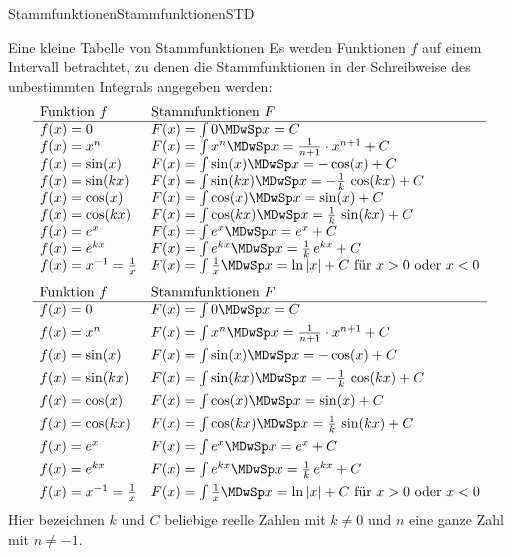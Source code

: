 \begin{MXContent}{Stammfunktionen}{Stammfunktionen}{STD}
\begin{MXInfo}{Eine kleine Tabelle von Stammfunktionen}%
%
Es werden Funktionen $f$ auf einem Intervall betrachtet, zu denen die 
Stammfunktionen in der Schreibweise des unbestimmten Integrals angegeben werden:
\ifttm
\[
\begin{array}{ll}
\text{Funktion } f & \text{Stammfunktionen } F \\
\hline
f(x) = 0                    & F(x) = \int 0 \MDwSp x = C \\
f(x) = x^n                  & F(x) = \int x^n \MDwSp x = \frac{1}{n+1} \cdot x^{n+1} + C \\
f(x) = \sin(x)              & F(x) = \int \sin(x) \MDwSp x = -\cos(x) + C \\
f(x) = \sin(k x)            & F(x) = \int \sin(k x) \MDwSp x = -\frac{1}{k}\,\cos(k x) + C \\
f(x) = \cos(x)              & F(x) = \int \cos(x) \MDwSp x = \sin(x) + C \\
f(x) = \cos(k x)            & F(x) = \int \cos(k x) \MDwSp x = \frac{1}{k}\,\sin(k x) + C \\
f(x) = \MEU^x               & F(x) = \int \MEU^x \MDwSp x = \MEU^x + C \\
f(x) = \MEU^{k x}           & F(x) = \int \MEU^{k x} \MDwSp x = \frac{1}{k}\,\MEU^{k x} + C \\
f(x) = x^{-1} = \frac{1}{x} & F(x) = \int \frac{1}{x} \MDwSp x = \ln|x| + C  %
\text{ für } x > 0 \text{ oder } x < 0 %
\end{array}
\]
\else
\[
\begin{array}{ll}
\text{Funktion } f & \mbox{Stammfunktionen } F \\
\hline
f(x) = 0                    & F(x) = \int 0 \MDwSp x = C \\[1ex]
f(x) = x^n                  & F(x) = \int x^n \MDwSp x = \frac{1}{n+1} \cdot x^{n+1} + C \\[1ex]
f(x) = \sin(x)              & F(x) = \int \sin(x) \MDwSp x = -\cos(x) + C \\[1ex]
f(x) = \sin(k x)            & F(x) = \int \sin(k x) \MDwSp x = -\frac{1}{k}\,\cos(k x) + C \\[1ex]
f(x) = \cos(x)              & F(x) = \int \cos(x) \MDwSp x = \sin(x) + C \\[1ex]
f(x) = \cos(k x)            & F(x) = \int \cos(k x) \MDwSp x = \frac{1}{k}\,\sin(k x) + C \\[1ex]
f(x) = \MEU^x               & F(x) = \int \MEU^x \MDwSp x = \MEU^x + C \\[1ex]
f(x) = \MEU^{k x}           & F(x) = \int \MEU^{k x} \MDwSp x = \frac{1}{k}\,\MEU^{k x} + C \\[1ex]
f(x) = x^{-1} = \frac{1}{x} & F(x) = \int \frac{1}{x} \MDwSp x = \ln|x| + C %
\text{ für } x > 0 \text{ oder } x < 0 %
\end{array}
\]
\fi
Hier bezeichnen $k$ und $C$ beliebige reelle Zahlen mit $k \neq 0$ und $n$ eine 
ganze Zahl mit $n \neq -1$.
\end{MXInfo}


\end{MXContent}

